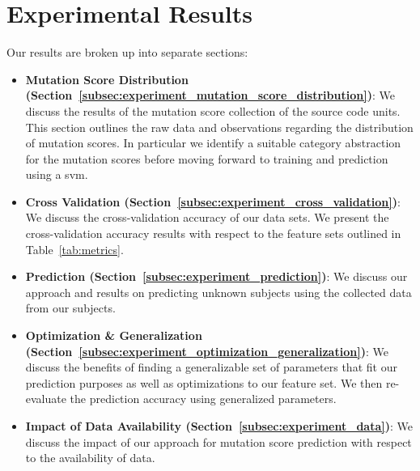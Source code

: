 \section{Experimental Results}
\label{sec:experiment_results}
Our results are broken up into separate sections:

\begin{itemize}
  \item \textbf{Mutation Score Distribution (Section~\ref{subsec:experiment_mutation_score_distribution})}: We discuss the results of the mutation score collection of the source code units. This section outlines the raw data and observations regarding the distribution of mutation scores. In particular we identify a suitable category abstraction for the mutation scores before moving forward to training and prediction using a \gls{svm}.
  \item \textbf{Cross Validation (Section~\ref{subsec:experiment_cross_validation})}: We discuss the cross-validation accuracy of our data sets. We present the cross-validation accuracy results with respect to the feature sets outlined in Table~\ref{tab:metrics}.
  \item \textbf{Prediction (Section~\ref{subsec:experiment_prediction})}: We discuss our approach and results on predicting unknown subjects using the collected data from our subjects.
  \item \textbf{Optimization \& Generalization (Section~\ref{subsec:experiment_optimization_generalization})}: We discuss the benefits of finding a generalizable set of parameters that fit our prediction purposes as well as optimizations to our feature set. We then re-evaluate the prediction accuracy using generalized parameters.
  \item \textbf{Impact of Data Availability (Section~\ref{subsec:experiment_data})}: We discuss the impact of our approach for mutation score prediction with respect to the availability of data.
\end{itemize}



